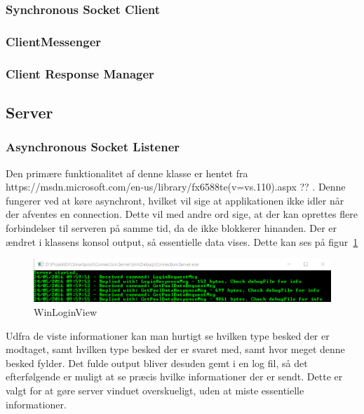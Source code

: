\subsubsection{Synchronous Socket Client}

\subsubsection{ClientMessenger}

\subsubsection{Client Response Manager}

\subsection{Server}

\subsubsection{Asynchronous Socket Listener}
Den primære funktionalitet af denne klasse er hentet fra https://msdn.microsoft.com/en-us/library/fx6588te(v=vs.110).aspx ?? . Denne fungerer ved at køre asynchront, hvilket vil sige at applikationen ikke idler når der afventes en connection. Dette vil med andre ord sige, at der kan oprettes flere forbindelser til serveren på samme tid, da de ikke blokkerer hinanden.
Der er ændret i klassens konsol output, så essentielle data vises. Dette kan ses på figur~\ref{fig:asynchronousSocketListener}

\begin{figure}
	\centering
	\includegraphics[width=0.7\linewidth]{figs/connection/asynchronousSocketListener.png}
	\caption{WinLoginView}
	\label{fig:asynchronousSocketListener}
\end{figure}

Udfra de viste informationer kan man hurtigt se hvilken type besked der er modtaget, samt hvilken type besked der er svaret med, samt hvor meget denne besked fylder. Det fulde output bliver desuden gemt i en log fil, så det efterfølgende er muligt at se præcis hvilke informationer der er sendt. Dette er valgt for at gøre server vinduet overskueligt, uden at miste essentielle informationer.

